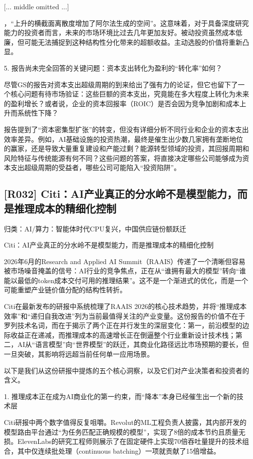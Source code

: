 \documentclass[11pt]{ctexart}
\begin{document}
[... middle omitted ...]

，“上升的横截面离散度增加了阿尔法生成的空间”。这意味着，对于具备深度研究能力的投资者而言，未来的市场环境比过去几年更加友好。被动投资虽然成本低廉，但可能无法捕捉到这种结构性分化带来的超额收益。主动选股的价值将重新凸显。

5. 报告尚未完全回答的关键问题：资本支出转化为盈利的“转化率”如何？

尽管GS的报告对资本支出超级周期的到来给出了强有力的论证，但它也留下了一个核心问题有待市场验证：这些巨额的资本支出，究竟能在多大程度上转化为未来的盈利增长？或者说，企业的资本回报率（ROIC）是否会因为竞争加剧和成本上升而系统性下降？

报告提到了“资本密集型扩张”的转变，但没有详细分析不同行业和企业的资本支出效率差异。例如，AI基础设施的投资热潮，最终是催生出少数几家拥有垄断地位的赢家，还是导致大量重复建设和产能过剩？能源转型领域的投资，其回报周期和风险特征与传统能源有何不同？这些问题的答案，将直接决定哪些公司能够成为资本支出超级周期的受益者，哪些公司可能陷入“投资陷阱”。

\subsection{[R032] Citi：AI产业真正的分水岭不是模型能力，而是推理成本的精细化控制}
{\small\color{refgray}归类：AI/算力：智能体时代CPU复兴，中国供应链份额跃迁}

Citi：AI产业真正的分水岭不是模型能力，而是推理成本的精细化控制

2026年6月的Research and Applied AI Summit（RAAIS）传递了一个清晰但容易被市场噪音掩盖的信号：AI行业的竞争焦点，正在从“谁拥有最大的模型”转向“谁能以最低的token成本交付可用的推理结果”。这不是一个渐进式的优化，而是一个可能重塑产业链价值分配的结构性转折。

Citi在最新发布的研报中系统梳理了RAAIS 2026的核心技术趋势，并将“推理成本效率”和“递归自我改进”列为当前最值得关注的产业变量。这份报告的价值不在于罗列技术名词，而在于揭示了两个正在并行发生的深层变化：第一，前沿模型的边际收益正在递减，而推理成本的高速增长正在倒逼整个行业重新设计技术栈；第二，AI从“语言模型”向“世界模型”的跃迁，其商业化路径远比市场预期的要长，但一旦突破，其影响将远超当前任何单一应用场景。

以下是我们从这份研报中提炼的五个核心洞察，以及它们对产业决策者和投资者的含义。

1. 推理成本正在成为AI商业化的第一约束，而“降本”本身已经催生出一个新的技术层

Citi研报中两个数字值得反复咀嚼。Revolut的ML工程负责人披露，其内部开发的模型路由平台通过“为任务匹配正确规模的模型”，实现了8倍的成本节约且质量无损。ElevenLabs的研究工程师则展示了在固定硬件上实现70倍吞吐量提升的技术组合，其中仅连续批处理（continuous batching）一项就贡献了15倍增益。
\end{document}
